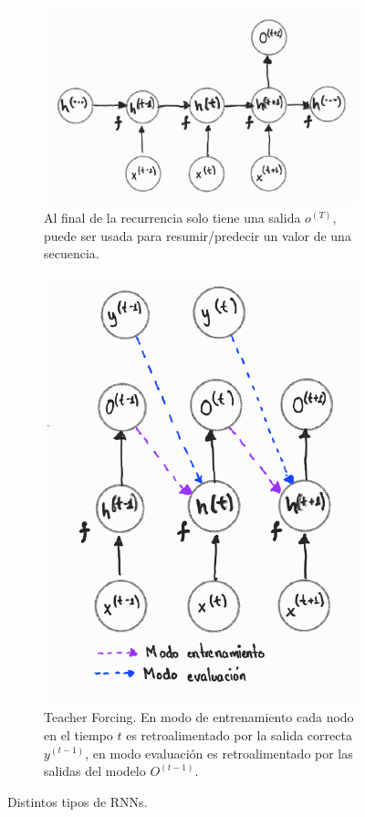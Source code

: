 \begin{figure}[!ht]
    \begin{subfigure}[b]{0.4\textwidth}
        \centering
        \includegraphics[height=0.63\textwidth]{Chapters/2. Transformer/Figures/rnn/rnn_cfgc.png}
        \caption{Al final de la recurrencia solo tiene una salida $o^{(T)}$, puede ser usada para
        resumir/predecir un valor de una secuencia.}
        \label{fig:rnn_cfgc}
    \end{subfigure}
    \hfill
    \begin{subfigure}[b]{0.49\textwidth}
        \centering
        \includegraphics[height=0.6\textwidth]{Chapters/2. Transformer/Figures/rnn/rnn_cfgd.png}
        \caption{Teacher Forcing. En modo de entrenamiento cada nodo en el tiempo $t$ es
        retroalimentado por la salida correcta $y^{(t-1)}$, en modo evaluación es retroalimentado por las
        salidas del modelo $O^{(t-1)}$.}
        \label{fig:rnn_cfgd}
    \end{subfigure}

    \caption[RNN - CFG]{Distintos tipos de RNNs.}
    \label{fig:three graphs}
\end{figure}


